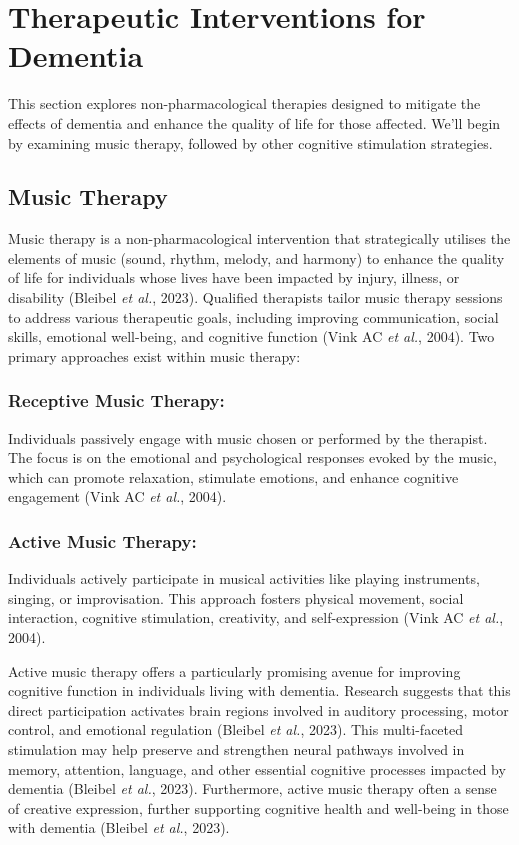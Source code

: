 \documentclass{l4proj}
\begin{document}
\section{Therapeutic Interventions for Dementia}
This section explores non-pharmacological therapies designed to mitigate the effects of dementia and enhance the quality of life for those affected. We'll begin by examining music therapy, followed by other cognitive stimulation strategies.

\subsection{Music Therapy}\label{sec:music_therapy}

Music therapy is a non-pharmacological intervention that strategically utilises the elements of music (sound, rhythm, melody, and harmony) to enhance the quality of life for individuals whose lives have been impacted by injury, illness, or disability (Bleibel \emph{et al.}, 2023). Qualified therapists tailor music therapy sessions to address various therapeutic goals, including improving communication, social skills, emotional well-being, and cognitive function (Vink AC \emph{et al.}, 2004). Two primary approaches exist within music therapy:

\subsubsection{Receptive Music Therapy:} Individuals passively engage with music chosen or performed by the therapist. The focus is on the emotional and psychological responses evoked by the music, which can promote relaxation, stimulate emotions, and enhance cognitive engagement (Vink AC \emph{et al.}, 2004).

\subsubsection{Active Music Therapy:} Individuals actively participate in musical activities like playing instruments, singing, or improvisation.  This approach fosters physical movement, social interaction, cognitive stimulation, creativity, and self-expression (Vink AC \emph{et al.}, 2004).

Active music therapy offers a particularly promising avenue for improving cognitive function in individuals living with dementia. Research suggests that this direct participation activates brain regions involved in auditory processing, motor control, and emotional regulation (Bleibel \emph{et al.}, 2023). This multi-faceted stimulation may help preserve and strengthen neural pathways involved in memory, attention, language, and other essential cognitive processes impacted by dementia (Bleibel \emph{et al.}, 2023).  Furthermore, active music therapy often a sense of creative expression, further supporting cognitive health and well-being in those with dementia (Bleibel \emph{et al.}, 2023).
\end{document}

